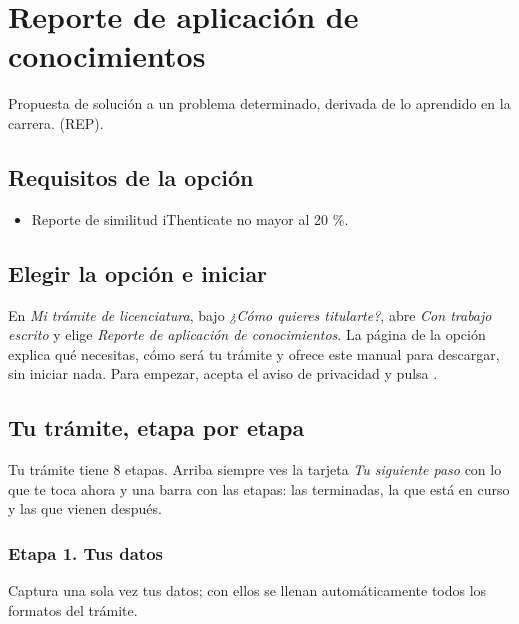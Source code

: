 \section{Reporte de aplicación de conocimientos}
Propuesta de solución a un problema determinado, derivada de lo aprendido en la carrera. (REP).

\subsection{Requisitos de la opción}
\begin{itemize}
  \item Reporte de similitud iThenticate no mayor al 20 \%.
\end{itemize}
\subsection{Elegir la opción e iniciar}
En \emph{Mi trámite de licenciatura}, bajo \emph{¿Cómo quieres titularte?}, abre \emph{Con trabajo escrito} y elige \emph{Reporte de aplicación de conocimientos}. La página de la opción explica qué necesitas, cómo será tu trámite y ofrece este manual para descargar, sin iniciar nada. Para empezar, acepta el aviso de privacidad y pulsa .
\subsection{Tu trámite, etapa por etapa}
Tu trámite tiene 8 etapas. Arriba siempre ves la tarjeta \emph{Tu siguiente paso} con lo que te toca ahora y una barra con las etapas: las terminadas, la que está en curso y las que vienen después.
\subsubsection*{Etapa 1. Tus datos}
Captura una sola vez tus datos; con ellos se llenan automáticamente todos los formatos del trámite.

